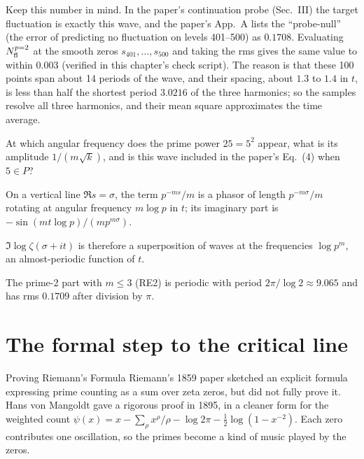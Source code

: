 Keep this number in mind. In the paper's continuation probe (Sec.~III) the target fluctuation is exactly this wave, and the paper's App.~A lists the ``probe-null'' (the error of predicting no fluctuation on levels 401--500) as $0.1708$. Evaluating $N^{p=2}_{\rm fl}$ at the smooth zeros $s_{401},\dots,s_{500}$ and taking the rms gives the same value to within $0.003$ (verified in this chapter's check script). The reason is that these 100 points span about 14 periods of the wave, and their spacing, about $1.3$ to $1.4$ in $t$, is less than half the shortest period $3.0216$ of the three harmonics; so the samples resolve all three harmonics, and their mean square approximates the time average.

\begin{checkpoint}
At which angular frequency does the prime power $25=5^2$ appear, what is its amplitude $1/(m\sqrt k)$, and is this wave included in the paper's Eq.~(4) when $5\in P$?
\end{checkpoint}

\begin{keyideas}
\item On a vertical line $\Re s=\sigma$, the term $p^{-ms}/m$ is a phasor of length $p^{-m\sigma}/m$ rotating at angular frequency $m\log p$ in $t$; its imaginary part is $-\sin(mt\log p)/(mp^{m\sigma})$.
\item $\Im\log\zeta(\sigma+it)$ is therefore a superposition of waves at the frequencies $\log p^m$, an almost-periodic function of $t$.
\item The prime-2 part with $m\le3$ (RE2) is periodic with period $2\pi/\log2\approx9.065$ and has rms $0.1709$ after division by $\pi$.
\end{keyideas}

\section{The formal step to the critical line}\label{sec:explicit-formula-formal}
\begin{didyouknow}{Proving Riemann's Formula}
Riemann's 1859 paper sketched an explicit formula expressing prime counting as a sum over zeta zeros, but did not fully prove it. Hans von Mangoldt gave a rigorous proof in 1895, in a cleaner form for the weighted count $\psi(x)=x-\sum_\rho x^\rho/\rho-\log 2\pi-\tfrac12\log(1-x^{-2})$. Each zero contributes one oscillation, so the primes become a kind of music played by the zeros.
\end{didyouknow}


